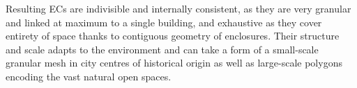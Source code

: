 Resulting ECs are indivisible and internally consistent, as they are very granular and
linked at maximum to a single building, and exhaustive as they cover entirety of space
thanks to contiguous geometry of enclosures. Their structure and scale adapts to the
environment and can take a form of a small-scale granular mesh in city centres of
historical origin as well as large-scale polygons encoding the vast natural open spaces.






